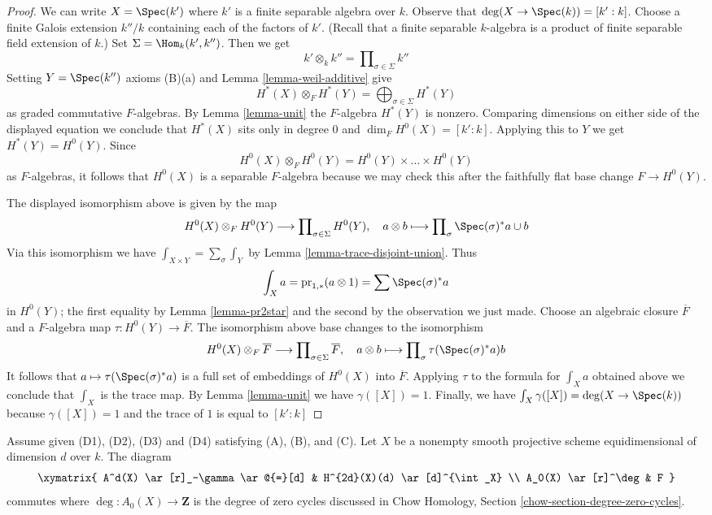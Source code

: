\begin{proof}
We can write $X = \Spec(k')$ where $k'$ is a finite separable
algebra over $k$. Observe that $\deg(X \to \Spec(k)) = [k' : k]$.
Choose a finite Galois extension $k''/k$ containing each of the
factors of $k'$. (Recall that a finite separable $k$-algebra is
a product of finite separable field extension of $k$.)
Set $\Sigma = \Hom_k(k', k'')$. Then we get
$$
k' \otimes_k k'' = \prod\nolimits_{\sigma \in \Sigma} k''
$$
Setting $Y = \Spec(k'')$ axioms (B)(a) and Lemma \ref{lemma-weil-additive} give
$$
H^*(X) \otimes_F H^*(Y) =
\bigoplus\nolimits_{\sigma \in \Sigma} H^*(Y)
$$
as graded commutative $F$-algebras. By Lemma \ref{lemma-unit} the
$F$-algebra $H^*(Y)$ is nonzero. Comparing dimensions on either side
of the displayed equation we conclude that $H^*(X)$ sits only in degree $0$
and $\dim_F H^0(X) = [k' : k]$. Applying this to $Y$ we get
$H^*(Y) = H^0(Y)$. Since
$$
H^0(X) \otimes_F H^0(Y) = H^0(Y) \times \ldots \times H^0(Y)
$$
as $F$-algebras, it follows that $H^0(X)$ is a separable $F$-algebra
because we may check this after the faithfully flat base change
$F \to H^0(Y)$.

\medskip\noindent
The displayed isomorphism above is given by the map
$$
H^0(X) \otimes_F H^0(Y) \longrightarrow
\prod\nolimits_{\sigma \in \Sigma} H^0(Y),\quad
a \otimes b \longmapsto \prod\nolimits_\sigma \Spec(\sigma)^*a \cup b
$$
Via this isomorphism we have $\int_{X \times Y} = \sum_\sigma \int_Y$ by
Lemma \ref{lemma-trace-disjoint-union}. Thus
$$
\int_X a = \text{pr}_{1, *}(a \otimes 1) = \sum \Spec(\sigma)^*a
$$
in $H^0(Y)$; the first equality by Lemma \ref{lemma-pr2star}
and the second by the observation we just made. Choose an
algebraic closure $\overline{F}$ and
a $F$-algebra map $\tau : H^0(Y) \to \overline{F}$.
The isomorphism above base changes to the isomorphism
$$
H^0(X) \otimes_F \overline{F} \longrightarrow
\prod\nolimits_{\sigma \in \Sigma} \overline{F},\quad
a \otimes b \longmapsto \prod\nolimits_\sigma \tau(\Spec(\sigma)^*a) b
$$
It follows that $a \mapsto \tau(\Spec(\sigma)^*a)$ is a full set
of embeddings of $H^0(X)$ into $\overline{F}$. Applying $\tau$
to the formula for $\int_X a$ obtained above we conclude
that $\int_X$ is the trace map.
By Lemma \ref{lemma-unit} we have $\gamma([X]) = 1$.
Finally, we have $\int_X \gamma([X]) = \deg(X \to \Spec(k))$
because $\gamma([X]) = 1$ and the trace of $1$ is equal to $[k' : k]$
\end{proof}

\begin{lemma}
\label{lemma-degrees-cycles}
Assume given (D1), (D2), (D3) and (D4) satisfying (A), (B), and (C).
Let $X$ be a nonempty smooth projective scheme
equidimensional of dimension $d$ over $k$. The diagram
$$
\xymatrix{
A^d(X) \ar[r]_-\gamma \ar@{=}[d] &
H^{2d}(X)(d) \ar[d]^{\int_X} \\
A_0(X) \ar[r]^\deg & F
}
$$
commutes where $\deg : A_0(X) \to \mathbf{Z}$ is the degree of
zero cycles discussed in Chow Homology, Section
\ref{chow-section-degree-zero-cycles}.
\end{lemma}

